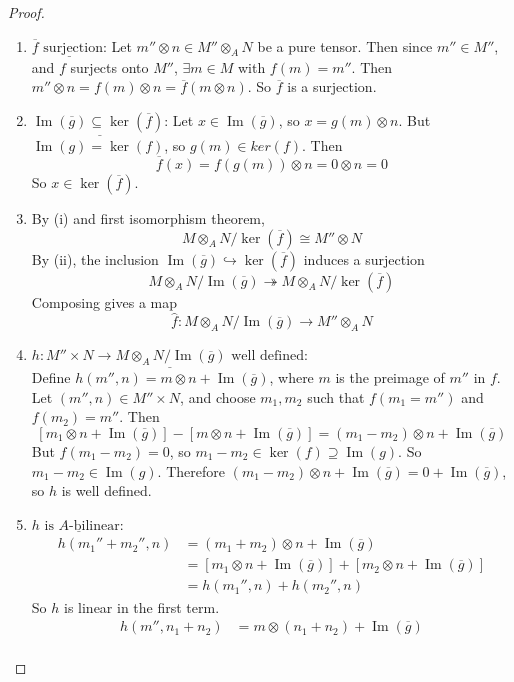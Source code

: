 \documentclass[hidelinks,12pt]{article}
\newcommand{\ul}{\underline}
\newcommand{\im}{\operatorname{Im}}
\begin{document}
\begin{proof}
\begin{enumerate}[label=(\roman*).]
    \item \(\ul{\overline{f}\text{ surjection:}}\) Let \(m''\otimes n\in M''\otimes_{A}N\) be a pure tensor. Then since \(m''\in M''\), and \(f\) surjects onto \(M''\), \(\exists m\in M\) with \(f(m)=m''\). Then \(m''\otimes n=f(m)\otimes n=\overline{f}(m\otimes n)\). So \(\overline{f}\) is a surjection.
    \item \(\ul{\im(\overline{g})\subseteq\ker(\overline{f})\text{:}}\) Let \(x\in \im(\overline{g})\), so \(x=g(m)\otimes n\). But \(\im(g)=\ker(f)\), so \(g(m)\in ker(f)\). Then \[
            \overline{f}(x)=f(g(m))\otimes n=0\otimes n=0
    \]
    So \(x\in\ker(\overline{f})\).
    \item By (i) and first isomorphism theorem, \[
            M\otimes_{A} N/\ker(\overline{f})\cong M''\otimes N
    \]
    By (ii), the inclusion \(\im(\overline{g})\hookrightarrow\ker(\overline{f})\) induces a surjection \[
        M\otimes_{A}N/\im(\overline{g})\twoheadrightarrow M\otimes_{A} N/\ker(\overline{f})
    \]
    Composing gives a map
    \[
        \hat{f}:M\otimes_{A}N/\im(\overline{g})\to M''\otimes_{A} N
    \]
\item \(\ul{h:M''\times N\to M\otimes_{A}N/\im(\overline{g})\text{ well defined:}}\)\\ Define \(h(m'',n)=m\otimes n+\im(\overline{g})\), where \(m\) is the preimage of \(m''\) in \(f\). Let \((m'',n)\in M''\times N\), and choose \(m_{1},m_{2}\) such that \(f(m_{1}=m'')\) and \(f(m_{2})=m''\). Then \[
        \left[m_{1}\otimes n+\im(\overline{g})\right]-\left[m\otimes n+\im(\overline{g})\right]=(m_{1}-m_{2})\otimes n+\im(\overline{g})
\]
But \(f(m_{1}-m_{2})=0\), so \(m_{1}-m_{2}\in\ker(f)\supseteq\im(g)\). So \(m_{1}-m_{2}\in\im(g)\). Therefore \((m_{1}-m_{2})\otimes n+\im(\overline{g})=0+\im(\overline{g})\), so \(h\) is well defined.
\item \(\ul{h\text{ is }A\text{-bilinear}:}\)
    \begin{align*}
        h(m_{1}''+m_{2}'',n) &=(m_{1}+m_{2})\otimes n+\im(\overline{g})\\
                             &=\left[m_{1}\otimes n+\im(\overline{g})\right]+\left[m_{2}\otimes n+\im(\overline{g})\right]\\
  &=h(m_{1}'',n)+h(m_{2}'',n)
    \end{align*}
    So \(h\) is linear in the first term.
    \begin{align*}
        h(m'',n_{1}+n_{2})&=m\otimes(n_{1}+n_{2})+\im(\overline{g})\\

\end{align*}
\end{enumerate}
\end{proof}
\end{document}
